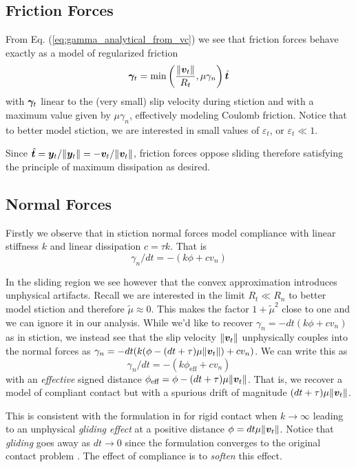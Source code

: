 \subsection{Friction Forces}
From Eq. (\ref{eq:gamma_analytical_from_vc}) we see that friction forces behave exactly as a
model of regularized friction
\begin{equation}
	{\bm\gamma}_t = \min\left(\frac{\Vert{\bm{v}}_t\Vert}{R_t}, \mu\gamma_n\right)\hat{{\bm{t}}}
\end{equation}
with ${\bm\gamma}_t$ linear to the (very small) slip velocity during stiction and
with a maximum value given by $\mu\gamma_n$, effectively modeling Coulomb
friction. Notice that to better model stiction, we are interested in small
values of $\varepsilon_t$, or $\varepsilon_t\ll 1$.

Since $\hat{{\bm{t}}} = {\bm{y}}_t/\Vert{\bm{y}}_t\Vert =
-{\bm{v}}_t/\Vert{\bm{v}}_t\Vert$, friction forces oppose sliding therefore
satisfying the principle of maximum dissipation as desired.

\subsection{Normal Forces}
Firstly we observe that in stiction normal forces model compliance with linear
stiffness $k$ and linear dissipation $c = \tau k$. That is
\begin{equation}
    \gamma_n/dt = -(k\phi + c v_n)
\end{equation}

In the sliding region we see however that the convex approximation introduces
unphysical artifacts. Recall we are interested in the limit $R_t \ll R_n$ to
better model stiction and therefore $\tilde\mu \approx 0$. This makes the factor
$1+\tilde{\mu}^2$ close to one and we can ignore it in our analysis. While we'd
like to recover $\gamma_n = -dt(k\phi + c v_n)$ as in stiction, we instead see
that the slip velocity $\Vert{\bm{v}}_t\Vert$ unphysically couples into the normal
forces as $\gamma_n=-dt(k(\phi-(dt+\tau)\mu\Vert{\bm{v}}_t\Vert) + cv_n)$. We can
write this as
\begin{equation}
  \gamma_n/dt=-(k\phi_\text{eff} + c v_n)
\end{equation}
with an \textit{effective} signed distance $\phi_\text{eff} =
\phi-(dt+\tau)\mu\Vert{\bm{v}}_t\Vert$. That is, we recover a model of compliant
contact but with a spurious drift of magnitude $(dt+\tau)\mu\Vert{\bm{v}}_t\Vert$.

This is consistent with the formulation in \cite{bib:anitescu2010} for rigid
contact when $k\rightarrow \infty$ leading to an unphysical \textit{gliding
effect} at a positive distance $\phi=dt\mu\Vert{\bm{v}}_t\Vert$. Notice that
\textit{gliding} goes away as $dt\rightarrow 0$ since the formulation converges
to the original contact problem \cite{bib:anitescu2006}. The effect of
compliance is to \textit{soften} this effect. 

